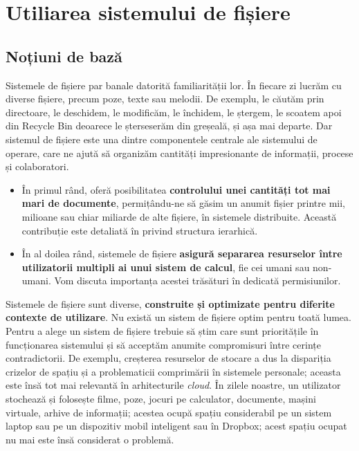 \chapter{Utiliarea sistemului de fișiere}
\label{chapter:file-system}

\section{Noțiuni de bază}
\label{sec:file-system-baza}

Sistemele de fișiere par banale datorită familiarității lor. În fiecare zi
lucrăm cu diverse fișiere, precum poze, texte sau melodii. De exemplu, le
căutăm prin directoare, le deschidem, le modificăm, le închidem, le ștergem, le
scoatem apoi din Recycle Bin deoarece le șterseserăm din greșeală, și așa mai
departe. Dar sistemul de fișiere este una dintre componentele centrale ale
sistemului de operare, care ne ajută să organizăm cantități
impresionante de informații, procese și colaboratori.

\begin{itemize}
	\item În primul rând, oferă posibilitatea \textbf{controlului unei
		cantități tot mai mari de documente}, permițându-ne să găsim un
		anumit fișier printre mii, milioane sau chiar miliarde de alte
		fișiere, în sistemele distribuite. Această contribuție este
		detaliată în 
		privind structura ierarhică.
	\item În al doilea rând, sistemele de fișiere \textbf{asigură separarea
		resurselor între utilizatorii multipli ai unui sistem de
		calcul}, fie cei umani sau non-umani. Vom discuta importanța
		acestei trăsături în 
		dedicată permisiunilor.
\end{itemize}

Sistemele de fișiere sunt diverse, \textbf{construite și optimizate pentru
diferite contexte de utilizare}. Nu există un sistem de fișiere
optim pentru toată lumea. Pentru a alege un sistem de fișiere trebuie să știm
care sunt prioritățile în funcționarea sistemului și să acceptăm anumite
compromisuri între cerințe contradictorii. De exemplu, creșterea resurselor de
stocare a dus la dispariția crizelor de spațiu și a problematicii comprimării în
sistemele personale; aceasta este însă tot mai relevantă în arhitecturile
\textit{cloud}. În zilele noastre, un utilizator stochează și folosește filme, poze, jocuri pe calculator, documente, mașini virtuale, arhive de informații; acestea ocupă spațiu considerabil pe un sistem laptop sau pe un dispozitiv mobil inteligent sau în Dropbox; acest spațiu ocupat nu mai este însă considerat o problemă.


